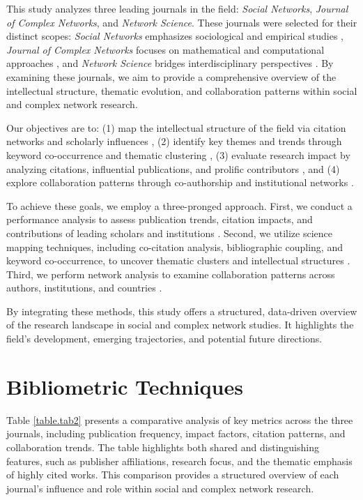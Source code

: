 \documentclass[twocolumn]{article}
\begin{document}
	This study analyzes three leading journals in the field: \textit{Social Networks}, \textit{Journal of Complex Networks}, and \textit{Network Science}. These journals were selected for their distinct scopes: \textit{Social Networks} emphasizes sociological and empirical studies \cite{wasserman1994social}, \textit{Journal of Complex Networks} focuses on mathematical and computational approaches \cite{boccaletti2006complex}, and \textit{Network Science} bridges interdisciplinary perspectives \cite{Newman2010}. By examining these journals, we aim to provide a comprehensive overview of the intellectual structure, thematic evolution, and collaboration patterns within social and complex network research.
	
	Our objectives are to: (1) map the intellectual structure of the field via citation networks and scholarly influences \cite{Small1973}, (2) identify key themes and trends through keyword co-occurrence and thematic clustering \cite{callon1983co}, (3) evaluate research impact by analyzing citations, influential publications, and prolific contributors \cite{garfield1979citation}, and (4) explore collaboration patterns through co-authorship and institutional networks \cite{glanzel2004coauthorship}.
	
	To achieve these goals, we employ a three-pronged approach. First, we conduct a performance analysis to assess publication trends, citation impacts, and contributions of leading scholars and institutions \cite{bornmann2011citation}. Second, we utilize science mapping techniques, including co-citation analysis, bibliographic coupling, and keyword co-occurrence, to uncover thematic clusters and intellectual structures \cite{van2010visualizing,chen2017citespace}. Third, we perform network analysis to examine collaboration patterns across authors, institutions, and countries \cite{newman2004coauthorship, moody2004sociology}.
	
	By integrating these methods, this study offers a structured, data-driven overview of the research landscape in social and complex network studies. It highlights the field's development, emerging trajectories, and potential future directions.
	
	
	
	
	\section{Bibliometric Techniques}\label{Bibliometric Techniques}
	
	Table \ref{table.tab2} presents a comparative analysis of key metrics across the three journals, including publication frequency, impact factors, citation patterns, and collaboration trends\cite{donthu2021bibliometric}. The table highlights both shared and distinguishing features, such as publisher affiliations, research focus, and the thematic emphasis of highly cited works. This comparison provides a structured overview of each journal’s influence and role within social and complex network research\cite{ WOS:000356343600002}.
	
\end{document}
